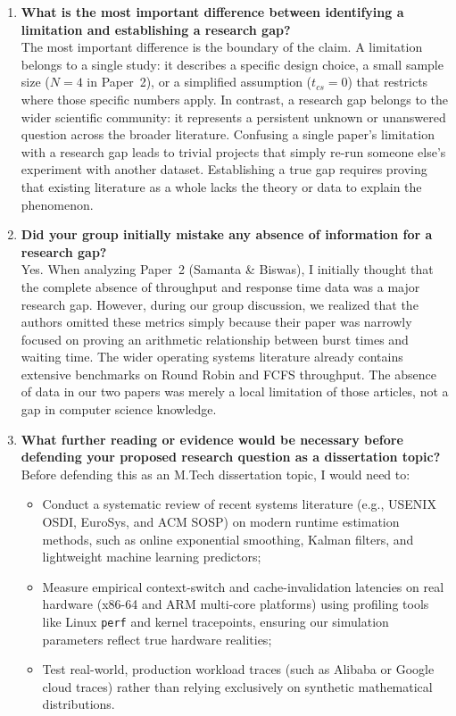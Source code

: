 \documentclass[11pt]{article}
\begin{document}
\begin{enumerate}[leftmargin=1.5em, itemsep=1.0em]
    \item \textbf{What is the most important difference between identifying a limitation and establishing a research gap?} \\
    The most important difference is the boundary of the claim. A limitation belongs to a single study: it describes a specific design choice, a small sample size ($N=4$ in Paper~2), or a simplified assumption ($t_{cs}=0$) that restricts where those specific numbers apply. In contrast, a research gap belongs to the wider scientific community: it represents a persistent unknown or unanswered question across the broader literature. Confusing a single paper's limitation with a research gap leads to trivial projects that simply re-run someone else's experiment with another dataset. Establishing a true gap requires proving that existing literature as a whole lacks the theory or data to explain the phenomenon.

    \item \textbf{Did your group initially mistake any absence of information for a research gap?} \\
    Yes. When analyzing Paper~2 (Samanta \& Biswas), I initially thought that the complete absence of throughput and response time data was a major research gap. However, during our group discussion, we realized that the authors omitted these metrics simply because their paper was narrowly focused on proving an arithmetic relationship between burst times and waiting time. The wider operating systems literature already contains extensive benchmarks on Round Robin and FCFS throughput. The absence of data in our two papers was merely a local limitation of those articles, not a gap in computer science knowledge.

    \item \textbf{What further reading or evidence would be necessary before defending your proposed research question as a dissertation topic?} \\
    Before defending this as an M.Tech dissertation topic, I would need to:
    \begin{itemize}[leftmargin=1.2em, itemsep=0.3em]
        \item Conduct a systematic review of recent systems literature (e.g., USENIX OSDI, EuroSys, and ACM SOSP) on modern runtime estimation methods, such as online exponential smoothing, Kalman filters, and lightweight machine learning predictors;
        \item Measure empirical context-switch and cache-invalidation latencies on real hardware (x86-64 and ARM multi-core platforms) using profiling tools like Linux \texttt{perf} and kernel tracepoints, ensuring our simulation parameters reflect true hardware realities;
        \item Test real-world, production workload traces (such as Alibaba or Google cloud traces) rather than relying exclusively on synthetic mathematical distributions.
    \end{itemize}
\end{enumerate}
\end{document}
